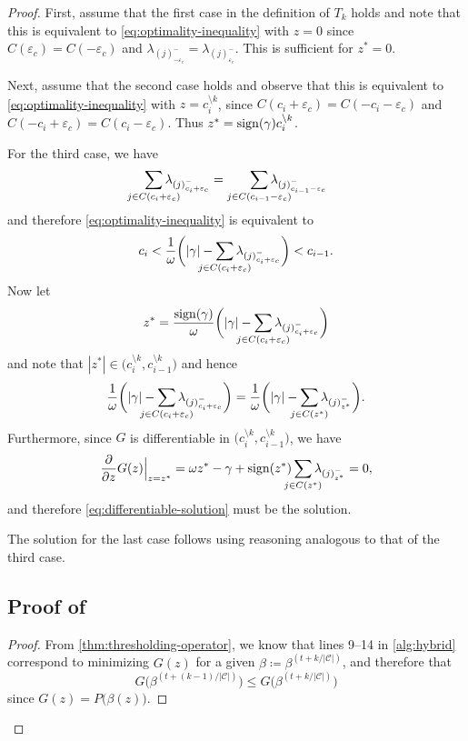 \begin{proof}
First, assume that the first case in the definition of \(T_k\) holds
and note that this is equivalent to \eqref{eq:optimality-inequality} with \(z
= 0\) since \(C({\varepsilon_c}) = C(-{\varepsilon_c})\) and
\(\lambda_{(j)^-_{-{\varepsilon_c}}} = \lambda_{(j)^-_{{\varepsilon_c}}}\).
This is sufficient for \(z^* = 0\).

Next, assume that the second case holds and observe that this is equivalent
to \eqref{eq:optimality-inequality} with
\(z = c_i^{\setminus k}\), since
\(C(c_i + {\varepsilon_c}) = C(-c_i - {\varepsilon_c})\) and
\(C(-c_i + {\varepsilon_c}) = C(c_i - {\varepsilon_c})\). Thus \(z^* =
\operatorname{sign}(\gamma)c_i^{\setminus k}\).

For the third case, we have
\[
  \smashoperator{\sum_{j \in C(c_i + {\varepsilon_c})}} \lambda_{(j)^-_{c_i + {\varepsilon_c}}}
  =
  \smashoperator[r]{\sum_{j \in C(c_{i-1} - {\varepsilon_c})}} \lambda_{(j)^-_{c_{i-1} - {\varepsilon_c}}}
\]
and therefore \eqref{eq:optimality-inequality} is equivalent to
\[
  c_i < \frac{1}{\omega} \bigg( |\gamma| - \smashoperator{\sum_{j \in C(c_i + {\varepsilon_c})}} \lambda_{(j)^-_{c_i + {\varepsilon_c}}} \bigg) < c_{i -1}.
\]
Now let
\begin{equation}
  \label{eq:differentiable-solution}
  z^* = \frac{\sign(\gamma)}{\omega} \bigg( |\gamma| - \smashoperator{\sum_{j \in C(c_i + {\varepsilon_c})}} \lambda_{(j)^-_{c_i + {\varepsilon_c}}} \bigg)
\end{equation}
and note that \(|z^*| \in \big(c_i^{\setminus k}, c_{i-1}^{\setminus k}\big)\) and hence
\[
  \frac{1}{\omega} \bigg( |\gamma| - \smashoperator{\sum_{j \in C(c_i + {\varepsilon_c})}} \lambda_{(j)^-_{c_i + {\varepsilon_c}}} \bigg)
  =
  \frac{1}{\omega} \bigg( |\gamma| - \smashoperator{\sum_{j \in C(z^*)}} \lambda_{(j)^-_{z^*}} \bigg).
\]
Furthermore, since \(G\) is differentiable in \(\big(c_i^{\setminus k}, c_{i-1}^{\setminus k}\big)\), we have
\[
  \frac{\partial}{\partial z} G(z) \Big|_{z = z^*}
  = \omega z^* - \gamma + \sign(z^*) \smashoperator{\sum_{j \in C(z^*)}} \lambda_{(j)^-_{z^*}} = 0,
\]
and therefore \eqref{eq:differentiable-solution} must be the solution.

The solution for the last case follows using reasoning analogous to that of the
third case.

\subsection{Proof of }

\begin{proof}
  From \cref{thm:thresholding-operator}, we know that lines 9--14 in \cref{alg:hybrid} correspond to minimizing \(G(z)\) for a given \(\beta \coloneqq \beta^{(t + k / |\mathcal{C}|)}\), and therefore that
  \[
    G\big(\beta^{(t + (k - 1) / |\mathcal{C}|)}\big) \leq G\big(\beta^{(t + k / |\mathcal{C}|)}\big)
  \]
  since \(G(z) = P\big(\beta(z)\big)\).


\end{proof}
\end{proof}
